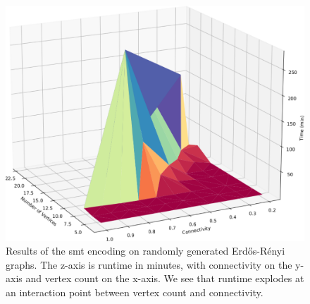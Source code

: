 \label{section:results-and-discussion}
%
\begin{figure}[t]
    \centering
    \includegraphics[width=1\linewidth]{Figures/big_ol_cliff.pdf}
    \caption{Results of the \ac{smt} encoding on randomly generated
      Erd\H{o}s-R\'{e}nyi graphs. The z-axis is runtime in minutes, with
      connectivity on the y-axis and vertex count on the x-axis. We see that
      runtime explodes at an interaction point between vertex count and
      connectivity.}%
    \label{fig:results}
\end{figure}%


